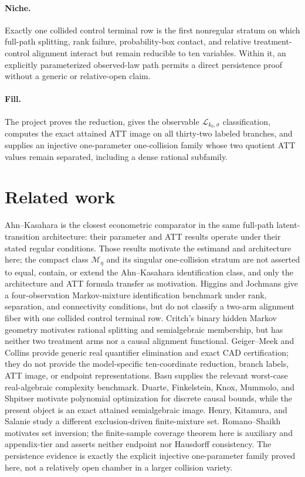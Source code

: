 \documentclass{article}
\begin{document}
\paragraph{Niche.} Exactly one collided control terminal row is the first nonregular stratum on which full-path splitting, rank failure, probability-box contact, and relative treatment-control alignment interact but remain reducible to ten variables. Within it, an explicitly parameterized observed-law path permits a direct persistence proof without a generic or relative-open claim.

\paragraph{Fill.} The project proves the reduction, gives the observable \(\mathscr L_{k_0,\sigma}\) classification, computes the exact attained ATT image on all thirty-two labeled branches, and supplies an injective one-parameter one-collision family whose two quotient ATT values remain separated, including a dense rational subfamily.

\section{Related work}

Ahn--Kasahara is the closest econometric comparator in the same full-path latent-transition architecture: their parameter and ATT results operate under their stated regular conditions. Those results motivate the estimand and architecture here; the compact class \(\mathcal M_\eta\) and its singular one-collision stratum are not asserted to equal, contain, or extend the Ahn--Kasahara identification class, and only the architecture and ATT formula transfer as motivation. Higgins and Jochmans give a four-observation Markov-mixture identification benchmark under rank, separation, and connectivity conditions, but do not classify a two-arm alignment fiber with one collided control terminal row. Critch's binary hidden Markov geometry motivates rational splitting and semialgebraic membership, but has neither two treatment arms nor a causal alignment functional. Geiger--Meek and Collins provide generic real quantifier elimination and exact CAD certification; they do not provide the model-specific ten-coordinate reduction, branch labels, ATT image, or endpoint representations. Basu supplies the relevant worst-case real-algebraic complexity benchmark. Duarte, Finkelstein, Knox, Mummolo, and Shpitser motivate polynomial optimization for discrete causal bounds, while the present object is an exact attained semialgebraic image. Henry, Kitamura, and Salanie study a different exclusion-driven finite-mixture set. Romano--Shaikh motivates set inversion; the finite-sample coverage theorem here is auxiliary and appendix-tier and asserts neither endpoint nor Hausdorff consistency. The persistence evidence is exactly the explicit injective one-parameter family proved here, not a relatively open chamber in a larger collision variety.
\end{document}
